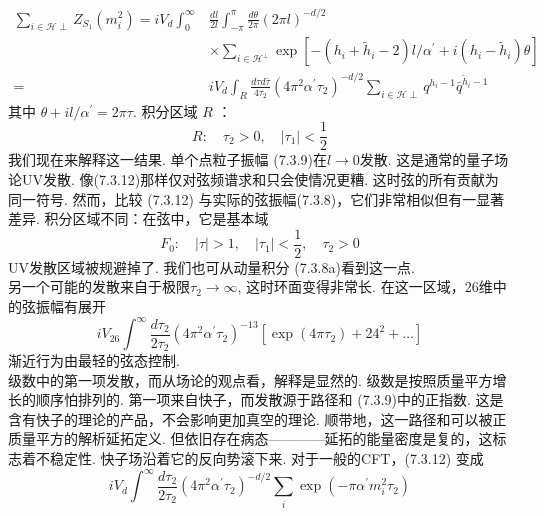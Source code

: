 \begin{equation}
	\begin{aligned}
		\sum_{i \in \mathscr{H} \perp} Z_{S_{1}}\left(m_{i}^{2}\right)=i V_{d} \int_{0}^{\infty} & \frac{d l}{2 l} \int_{-\pi}^{\pi} \frac{d \theta}{2 \pi}(2 \pi l)^{-d / 2} \\
		& \times \sum_{i \in \mathscr{H}^{\perp}} \exp \left[-\left(h_{i}+\tilde{h}_{i}-2\right) l / \alpha^{\prime}+i\left(h_{i}-\tilde{h}_{i}\right) \theta\right] \\
		=& i V_{d} \int_{R} \frac{d \tau d \bar{\tau}}{4 \tau_{2}}\left(4 \pi^{2} \alpha^{\prime} \tau_{2}\right)^{-d / 2} \sum_{i \in \mathscr{H} \perp} q^{h_{i}-1} \bar{q}^{\tilde{h}_{i}-1}
	\end{aligned}
\end{equation}
其中 $\theta+i l / \alpha^{\prime}=2 \pi \tau$. 积分区域 $R$ ：
\begin{equation}
	R: \quad \tau_{2}>0, \quad\left|\tau_{1}\right|<\frac{1}{2}
\end{equation}
我们现在来解释这一结果. 单个点粒子振幅 (7.3.9)在$l \rightarrow 0$发散. 这是通常的量子场论UV发散. 像(7.3.12)那样仅对弦频谱求和只会使情况更糟. 这时弦的所有贡献为同一符号. 然而，比较 (7.3.12) 与实际的弦振幅(7.3.8)，它们非常相似但有一显著差异. 积分区域不同：在弦中，它是基本域
\begin{equation}
	F_{0}: \quad|\tau|>1, \quad\left|\tau_{1}\right|<\frac{1}{2}, \quad \tau_{2}>0
\end{equation}
UV发散区域被规避掉了. 我们也可从动量积分 (7.3.8a)看到这一点. \\
另一个可能的发散来自于极限$\tau_{2} \rightarrow \infty$, 这时环面变得非常长. 在这一区域，26维中的弦振幅有展开
\begin{equation}
	i V_{26} \int^{\infty} \frac{d \tau_{2}}{2 \tau_{2}}\left(4 \pi^{2} \alpha^{\prime} \tau_{2}\right)^{-13}\left[\exp \left(4 \pi \tau_{2}\right)+24^{2}+\ldots\right]
\end{equation}
渐近行为由最轻的弦态控制.\\
级数中的第一项发散，而从场论的观点看，解释是显然的. 级数是按照质量平方增长的顺序怕排列的. 第一项来自快子，而发散源于路径和 (7.3.9)中的正指数. 这是含有快子的理论的产品，不会影响更加真空的理论. 顺带地，这一路径和可以被正质量平方的解析延拓定义. 但依旧存在病态————延拓的能量密度是复的，这标志着不稳定性. 快子场沿着它的反向势滚下来. 对于一般的CFT，(7.3.12) 变成
\begin{equation}
	i V_{d} \int^{\infty} \frac{d \tau_{2}}{2 \tau_{2}}\left(4 \pi^{2} \alpha^{\prime} \tau_{2}\right)^{-d / 2} \sum_{i} \exp \left(-\pi \alpha^{\prime} m_{i}^{2} \tau_{2}\right)
\end{equation}
